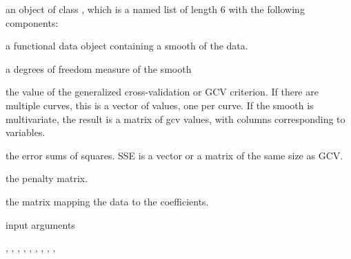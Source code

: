 \begin{Value}
an object of class , which is a named list of length 6
with the following components:

\begin{ldescription}
\item[\code{fd}] a functional data object containing a smooth of the data.

\item[\code{df}] a degrees of freedom measure of the smooth

\item[\code{gcv}] the value of the generalized cross-validation or GCV criterion.  If
there are multiple curves, this is a vector of values, one per
curve.  If the smooth is multivariate, the result is a matrix of gcv
values, with columns corresponding to variables.


\item[\code{SSE}] the error sums of squares.  SSE is a vector or a matrix of the same
size as GCV.

\item[\code{penmat}] the penalty matrix.

\item[\code{y2cMap}] the matrix mapping the data to the coefficients.

\item[\code{argvals, y}] input arguments
\end{ldescription}
\end{Value}
\begin{SeeAlso}\relax
{}, ,
, ,
, ,
, ,
, 
\end{SeeAlso}
